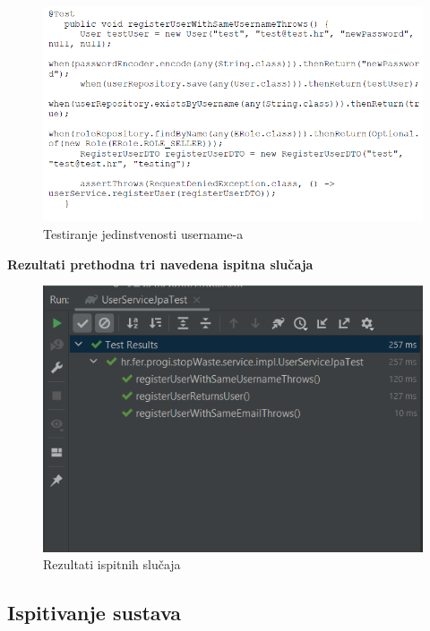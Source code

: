 			\begin{figure}[H]
				\includegraphics[scale=0.7]{slike/test6.PNG} %
				\centering
				\caption{Testiranje jedinstvenosti username-a}
				\label{fig:test6}
			\end{figure} 
		
	
			\textbf{Rezultati prethodna tri navedena ispitna slučaja }
		
		\begin{figure}[H]
			\includegraphics[scale=0.8]{slike/rezultati2.PNG} %
			\centering
			\caption{Rezultati ispitnih slučaja}
			\label{fig:rez2}
		\end{figure} 
		
			\subsection{Ispitivanje sustava}
			
